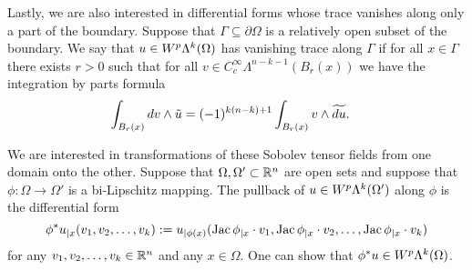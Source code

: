 \documentclass[12pt,a4paper]{article}
\begin{document}
Lastly, we are also interested in differential forms whose trace vanishes along only a part of the boundary. 
Suppose that $\Gamma \subseteq \partial\Omega$ is a relatively open subset of the boundary. 
We say that $u \in W^p\Lambda^{k}(\Omega)$ has vanishing trace along $\Gamma$ if for all $x \in \Gamma$ there exists $r > 0$
such that for all $v \in C^{\infty}_{c}\Lambda^{n-k-1}(B_r(x))$ we have the integration by parts formula
\begin{align*}
    \int_{B_r(x)} d v \wedge \tilde u
    &=
    (-1)^{k(n-k)+1}
    \int_{B_r(x)} v \wedge \widetilde{d u}
    .
\end{align*}

We are interested in transformations of these Sobolev tensor fields from one domain onto the other. 
Suppose that $\Omega,\Omega' \subset {\mathbb R}^{n}$ are open sets and suppose that $\phi: \Omega \to \Omega'$ is a bi-Lipschitz mapping.
The pullback of $u \in W^p\Lambda^{k}(\Omega')$ along $\phi$ is the differential form 
\[ 
    \phi^{\ast}u_{|x}( v_{1}, v_{2}, \ldots, v_{k} ) 
    := 
    u_{|\phi(x)}( \operatorname{{\rm Jac}}\phi_{|x} \cdot v_1, \operatorname{{\rm Jac}}\phi_{|x} \cdot v_2, \ldots, \operatorname{{\rm Jac}}\phi_{|x} \cdot v_k ) 
\]
for any $v_1, v_2, \dots, v_k \in {\mathbb R}^{n}$ and any $x \in \Omega$. One can show that $\phi^{\ast}u \in W^p\Lambda^{k}(\Omega)$.

\end{document}
